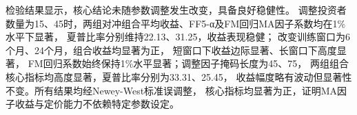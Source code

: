 检验结果显示，核心结论未随参数调整发生改变，具备良好稳健性。
调整投资者数量为15、45时，两组对冲组合平均收益、FF5-α及FM回归MA因子系数均在1\%水平下显著，
夏普比率分别维持22.13、31.25，收益表现稳健；
改变训练窗口为6个月、24个月，组合收益均显著为正，
短窗口下收益边际显著、长窗口下高度显著，
FM回归系数始终保持1\%水平显著；调整因子掩码长度为45、75，
两组组合核心指标均高度显著，夏普比率分别为33.31、25.45，
收益幅度略有波动但显著性不变。所有结果均经Newey-West标准误调整，
核心指标均显著为正，证明MA因子收益与定价能力不依赖特定参数设定。
